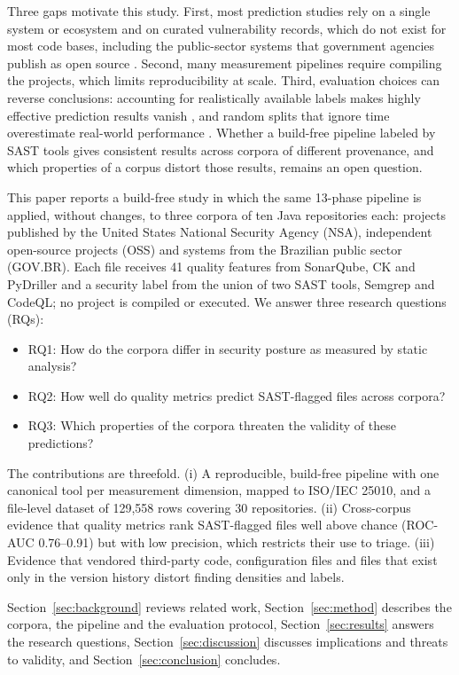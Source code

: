 \documentclass[a4paper,twoside]{article}
\begin{document}
Three gaps motivate this study. First, most prediction studies rely on a single system or ecosystem and on curated vulnerability records, which do not exist for most code bases, including the public-sector systems that government agencies publish as open source \cite{nguyenduc2021}. Second, many measurement pipelines require compiling the projects, which limits reproducibility at scale. Third, evaluation choices can reverse conclusions: accounting for realistically available labels makes highly effective prediction results vanish \cite{jimenez2019}, and random splits that ignore time overestimate real-world performance \cite{dou2026}. Whether a build-free pipeline labeled by SAST tools gives consistent results across corpora of different provenance, and which properties of a corpus distort those results, remains an open question.

This paper reports a build-free study in which the same 13-phase pipeline is applied, without changes, to three corpora of ten Java repositories each: projects published by the United States National Security Agency (NSA), independent open-source projects (OSS) and systems from the Brazilian public sector (GOV.BR). Each file receives 41 quality features from SonarQube, CK and PyDriller and a security label from the union of two SAST tools, Semgrep and CodeQL; no project is compiled or executed. We answer three research questions (RQs):

\begin{itemize}
  \item RQ1: How do the corpora differ in security posture as measured by static analysis?
  \item RQ2: How well do quality metrics predict SAST-flagged files across corpora?
  \item RQ3: Which properties of the corpora threaten the validity of these predictions?
\end{itemize}

The contributions are threefold. (i) A reproducible, build-free pipeline with one canonical tool per measurement dimension, mapped to ISO/IEC 25010, and a file-level dataset of 129,558 rows covering 30 repositories. (ii) Cross-corpus evidence that quality metrics rank SAST-flagged files well above chance (ROC-AUC 0.76--0.91) but with low precision, which restricts their use to triage. (iii) Evidence that vendored third-party code, configuration files and files that exist only in the version history distort finding densities and labels.

Section~\ref{sec:background} reviews related work, Section~\ref{sec:method} describes the corpora, the pipeline and the evaluation protocol, Section~\ref{sec:results} answers the research questions, Section~\ref{sec:discussion} discusses implications and threats to validity, and Section~\ref{sec:conclusion} concludes.
\end{document}
